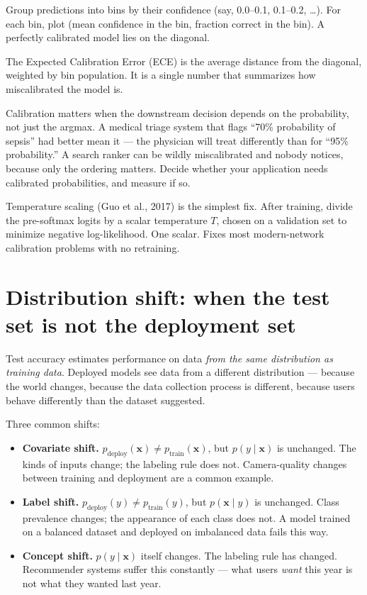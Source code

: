\begin{definition}
Group predictions into bins by their confidence (say, 0.0--0.1, 0.1--0.2, \ldots). For each bin, plot (mean confidence in the bin, fraction correct in the bin). A perfectly calibrated model lies on the diagonal.
\end{definition}

The Expected Calibration Error (ECE) is the average distance from the diagonal, weighted by bin population. It is a single number that summarizes how miscalibrated the model is.

\begin{intuition}
Calibration matters when the downstream decision depends on the probability, not just the argmax. A medical triage system that flags ``70\% probability of sepsis'' had better mean it --- the physician will treat differently than for ``95\% probability.'' A search ranker can be wildly miscalibrated and nobody notices, because only the ordering matters. Decide whether your application needs calibrated probabilities, and measure if so.
\end{intuition}

Temperature scaling (Guo et al., 2017) is the simplest fix. After training, divide the pre-softmax logits by a scalar temperature $T$, chosen on a validation set to minimize negative log-likelihood. One scalar. Fixes most modern-network calibration problems with no retraining.

\section{Distribution shift: when the test set is not the deployment set}

Test accuracy estimates performance on data \emph{from the same distribution as training data}. Deployed models see data from a different distribution --- because the world changes, because the data collection process is different, because users behave differently than the dataset suggested.

Three common shifts:

\begin{itemize}
  \item \textbf{Covariate shift.} $p_{\text{deploy}}(\bm{x}) \neq p_{\text{train}}(\bm{x})$, but $p(y \mid \bm{x})$ is unchanged. The kinds of inputs change; the labeling rule does not. Camera-quality changes between training and deployment are a common example.
  \item \textbf{Label shift.} $p_{\text{deploy}}(y) \neq p_{\text{train}}(y)$, but $p(\bm{x} \mid y)$ is unchanged. Class prevalence changes; the appearance of each class does not. A model trained on a balanced dataset and deployed on imbalanced data fails this way.
  \item \textbf{Concept shift.} $p(y \mid \bm{x})$ itself changes. The labeling rule has changed. Recommender systems suffer this constantly --- what users \emph{want} this year is not what they wanted last year.
\end{itemize}


